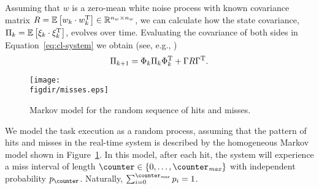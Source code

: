 Assuming that $w$ is a zero-mean white noise process with known covariance matrix $R = \mathbb{E}\left[ w_k \cdot w_k^{\mathrm{\small{T}}} \right] \in \mathbb{R}^{n_w \times n_w}$,
we can calculate how the state covariance, $\Pi_k = \mathbb{E}\left[ \xi_k\cdot \xi_k^{\mathrm{\small{T}}} \right]$, evolves over time. Evaluating the covariance of both sides in 
Equation~\eqref{eq:cl-system} we obtain (see, e.g., \cite{AstWit:1984})
\begin{equation}
\label{eq:covariance}
\Pi_{k+1} = \Phi_k \Pi_k \Phi_k^{\T} + \Gamma R \Gamma^{\T} .
\end{equation}


\begin{figure}[t]
    \centerline{\texttt{[image: \\figdir/misses.eps]}}
    \caption{Markov model for the random sequence of hits and misses.}
    \label{fig:Markov}
\end{figure}

We model the task execution as a random process, assuming that the pattern of hits and misses in the real-time system is described by the homogeneous Markov model shown in Figure~\ref{fig:Markov}.
In this model, after each hit, the system will experience a miss interval of length $\counter \in \{0,\ldots,\counter_\mathit{max}\}$ with independent probability $p_\counter$. Naturally, $\sum_{i=0}^{\counter_\mathit{max}} p_i = 1$.

